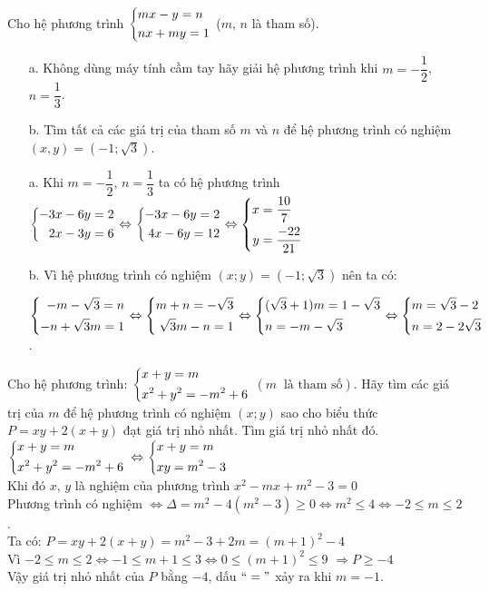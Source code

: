 \begin{ex}%
    Cho hệ phương trình $\left\{\begin{aligned}& mx-y=n\\&nx+my=1\end{aligned}\right.$ ($m$, $n$ là tham số).
    \begin{enumerate}
        \item[a.] Không dùng máy tính cầm tay hãy giải hệ phương trình khi $m=-\dfrac{1}{2}$, $n=\dfrac{1}{3}$.
        \item[b.] Tìm tất cả các giá trị của tham số $m$ và $n$ để hệ phương trình có nghiệm $(x,y)=(-1;\sqrt{3})$.
    \end{enumerate}
\loigiai
    {
   \begin{enumerate}
   	\item[a.] Khi $m=-\dfrac{1}{2}$, $n=\dfrac{1}{3}$ ta có hệ phương trình $\left\{\begin{aligned}-3x-6y=2\\2x-3y=6\end{aligned}\right.\Leftrightarrow\left\{\begin{aligned}-3x-6y=2\\4x-6y=12\end{aligned}\right.\Leftrightarrow\left\{\begin{aligned}x&=\dfrac{10}{7}\\y&=\dfrac{-22}{21}\end{aligned}\right.$
   	\item[b.] Vì hệ phương trình có nghiệm $(x;y)=(-1;\sqrt{3})$ nên ta có:
   	
   	$\left\{\begin{aligned}-m-\sqrt{3}=n\\-n+\sqrt{3}m=1\end{aligned}\right.\Leftrightarrow\left\{\begin{aligned}m+n=-\sqrt{3}\\ \sqrt{3}m-n=1\end{aligned}\right.\Leftrightarrow\left\{\begin{aligned}&(\sqrt{3}+1)m=1-\sqrt{3}\\&n=-m-\sqrt{3}\end{aligned}\right.\Leftrightarrow\left\{\begin{aligned}&m=\sqrt{3}-2\\&n=2-2\sqrt{3}\end{aligned}\right.$.
   \end{enumerate}
    }
\end{ex}
\begin{ex}%
Cho hệ phương trình: $\left\{\begin{aligned}&x+y=m\\&x^2+y^2=-m^2+6\end{aligned}\right.$ $\left(m \;\; \text{là tham số}\right)$.
Hãy tìm các giá trị của $m$ để hệ phương trình có nghiệm $\left(x; y\right)$ sao cho biểu thức $P=xy+2\left(x+y\right)$ đạt giá trị nhỏ nhất. Tìm giá trị nhỏ nhất đó.
\loigiai
    {
    $\left\{\begin{aligned}&x+y=m\\&x^2+y^2=-m^2+6\end{aligned}\right.$ $\Leftrightarrow \left\{\begin{aligned}&x+y=m\\&xy=m^2-3\end{aligned}\right.$ \\
Khi đó $x$, $y$ là nghiệm của phương trình $x^2-mx+m^2-3=0$\\
Phương trình có nghiệm $\Leftrightarrow \Delta = m^2-4(m^2-3) \ge 0 \Leftrightarrow m^2 \le 4 \Leftrightarrow -2\le m \le 2$.\\
Ta có: $P=xy+2\left(x+y\right)=m^2-3+2m=\left(m+1\right)^2-4$\\
Vì $-2\le m \le 2 \Leftrightarrow -1\le m+1 \le 3 \Leftrightarrow 0 \le \left(m+1\right)^2 \le 9$
$\Rightarrow P \ge -4$\\
Vậy giá trị nhỏ nhất của $P$ bằng $-4$, dấu $``="$ xảy ra khi $m=-1$.
    }
\end{ex}
